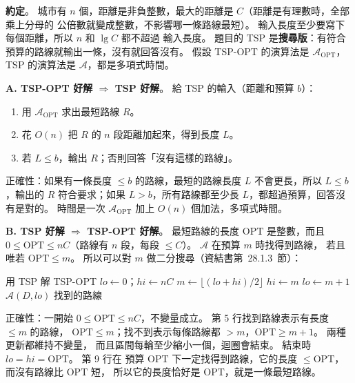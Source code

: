 \begin{pastsoln}
\textbf{約定}。 城市有 $n$ 個，距離是非負整數，最大的距離是 $C$（距離是有理數時，全部乘上分母的
公倍數就變成整數，不影響哪一條路線最短）。 輸入長度至少要寫下每個距離，所以 $n$ 和 $\lg C$ 都不超過
輸入長度。 題目的 TSP 是\textbf{搜尋版}：有符合預算的路線就輸出一條，沒有就回答沒有。 假設 TSP-OPT
的演算法是 $\mathcal{A}_{\text{OPT}}$，TSP 的演算法是 $\mathcal{A}$，都是多項式時間。

\textbf{A. TSP-OPT 好解 $\Rightarrow$ TSP 好解}。 給 TSP 的輸入（距離和預算 $b$）：
\begin{enumerate}
\item 用 $\mathcal{A}_{\text{OPT}}$ 求出最短路線 $R$。
\item 花 $O(n)$ 把 $R$ 的 $n$ 段距離加起來，得到長度 $L$。
\item 若 $L \le b$，輸出 $R$；否則回答「沒有這樣的路線」。
\end{enumerate}
正確性：如果有一條長度 $\le b$ 的路線，最短的路線長度 $L$ 不會更長，所以 $L \le b$，輸出的 $R$
符合要求；如果 $L > b$，所有路線都至少長 $L$，都超過預算，回答沒有是對的。 時間是一次
$\mathcal{A}_{\text{OPT}}$ 加上 $O(n)$ 個加法，多項式時間。

\textbf{B. TSP 好解 $\Rightarrow$ TSP-OPT 好解}。 最短路線的長度 $\mathrm{OPT}$ 是整數，而且
$0 \le \mathrm{OPT} \le nC$（路線有 $n$ 段，每段 $\le C$）。 $\mathcal{A}$ 在預算 $m$ 時找得到路線，
若且唯若 $\mathrm{OPT} \le m$。 所以可以對 $m$ 做二分搜尋（資結書第~28.1.3~節）：
\begin{pseudo}[unbreakable]{用 TSP 解 TSP-OPT}
 
    \State $\mathit{lo} \gets 0$；$\mathit{hi} \gets nC$ 
        \State $m \gets \lfloor (\mathit{lo} + \mathit{hi}) / 2 \rfloor$
            \State $\mathit{hi} \gets m$ 
        \Else
            \State $\mathit{lo} \gets m + 1$ 
        \EndIf
    \EndWhile
    \State \Return $\mathcal{A}(D, \mathit{lo})$ 找到的路線
\EndFunction
\end{pseudo}

正確性：一開始 $0 \le \mathrm{OPT} \le nC$，不變量成立。 第 5 行找到路線表示有長度 $\le m$ 的路線，
$\mathrm{OPT} \le m$；找不到表示每條路線都 $> m$，$\mathrm{OPT} \ge m + 1$。 兩種更新都維持不變量，
而且區間每輪至少縮小一個，迴圈會結束。 結束時 $\mathit{lo} = \mathit{hi} = \mathrm{OPT}$。 第 9 行在
預算 $\mathrm{OPT}$ 下一定找得到路線，它的長度 $\le \mathrm{OPT}$，而沒有路線比 $\mathrm{OPT}$ 短，
所以它的長度恰好是 $\mathrm{OPT}$，就是一條最短路線。


\end{pastsoln}
